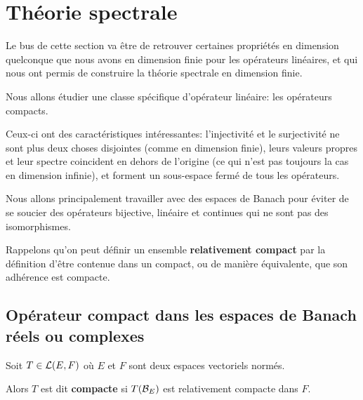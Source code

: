 \section{Théorie spectrale}

Le bus de cette section va être de retrouver certaines propriétés en dimension
quelconque que nous avons en dimension finie pour les opérateurs linéaires, et
qui nous ont permis de construire la théorie spectrale en dimension finie.

Nous allons étudier une classe spécifique d'opérateur linéaire: les opérateurs
compacts.

Ceux-ci ont des caractéristiques intéressantes: l'injectivité et le surjectivité
ne sont plus deux choses disjointes (comme en dimension finie), leurs valeurs
propres et leur spectre coincident en dehors de l'origine (ce qui n'est pas
toujours la cas en dimension infinie), et forment un sous-espace fermé de tous
les opérateurs.

Nous allons principalement travailler avec des espaces de Banach pour éviter de
se soucier des opérateurs bijective, linéaire et continues qui ne sont pas des
isomorphismes.




Rappelons qu'on peut définir un ensemble \textbf{relativement compact} par la
définition d'être contenue dans un compact, ou de manière équivalente, que son
adhérence est compacte.

\subsection{Opérateur compact dans les espaces de Banach réels ou complexes}

\begin{definition}
	Soit $T \in \mathcal{L}(E, F)$ où $E$ et $F$ sont deux espaces
	vectoriels normés.

	Alors $T$ est dit \textbf{compacte} si $T(\mathcal{B}_{E})$ est relativement compacte
	dans $F$.
\end{definition}

